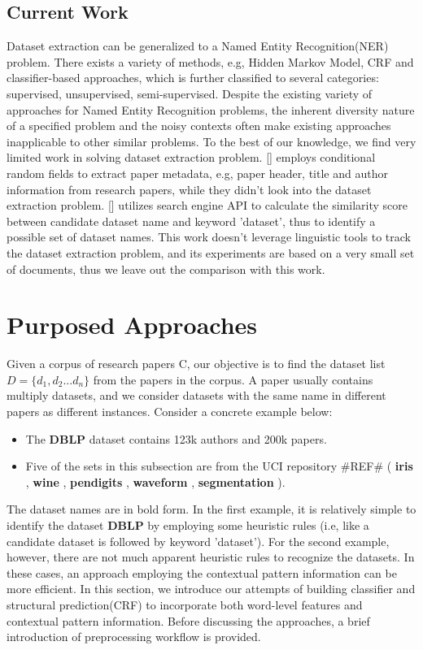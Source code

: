 \documentclass[10pt]{article}
\begin{document}
\subsection{Current Work}
Dataset extraction can be generalized to a Named Entity Recognition(NER) problem. There exists a variety of methods, e.g, Hidden Markov Model, CRF and classifier-based approaches, which is further classified to several categories: supervised, unsupervised, semi-supervised. Despite the existing variety of approaches for Named Entity Recognition problems, the inherent diversity nature of a specified problem and the noisy contexts often make existing approaches inapplicable to other similar problems. To the best of our knowledge, we find very limited work in solving dataset extraction problem. [] employs conditional random fields to extract paper metadata, e.g, paper header, title and author information from research papers, while they didn't look into the dataset extraction problem. [] utilizes search engine API to calculate the similarity score between candidate dataset name and keyword 'dataset', thus to identify a possible set of dataset names. This work doesn't leverage linguistic tools to track the dataset extraction problem, and its experiments are based on a very small set of documents, thus we leave out the comparison with this work. 

\section{Purposed Approaches}
Given a corpus of research papers C, our objective is to find the dataset list $D = \{ d_1, d_2...d_n\}$ from the papers in the corpus. A paper usually contains multiply datasets, and we consider datasets with the same name in different papers as different instances. Consider a concrete example below: 
\begin{itemize}
\item The \textbf{DBLP} dataset contains 123k authors and 200k papers. 
\item Five of the sets in this subsection are from the UCI repository \#REF\# ( \textbf{iris} , \textbf{wine} , \textbf{pendigits} , \textbf{waveform} , \textbf{segmentation} ).
\end{itemize}
The dataset names are in bold form. In the first example, it is relatively simple to identify the dataset \textbf{DBLP} by employing some heuristic rules (i.e, like a candidate dataset is followed by keyword 'dataset'). For the second example, however, there are not much apparent heuristic rules to recognize 
the datasets. In these cases, an approach employing the contextual pattern information can be more efficient. In this section, we introduce our attempts of building classifier and structural prediction(CRF) to incorporate both word-level features and contextual pattern information. Before discussing the approaches, a brief introduction of preprocessing workflow is provided. 
\end{document}
